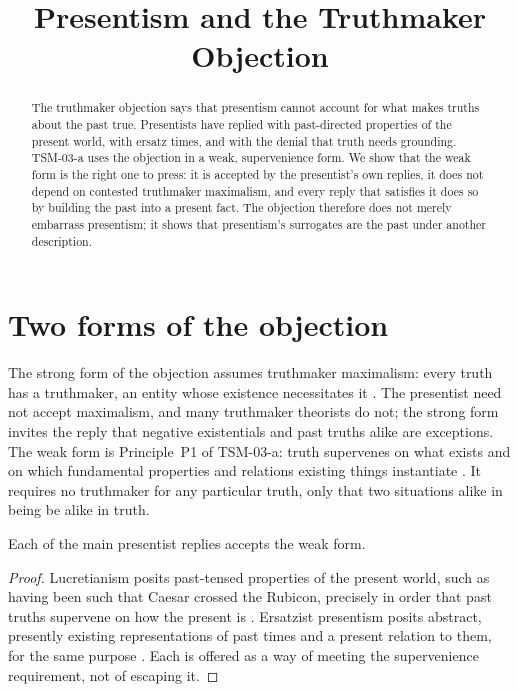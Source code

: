 \documentclass{situationist-preprint}
\title{Presentism and the Truthmaker Objection}
\begin{document}
\maketitle

\begin{abstract}
The truthmaker objection says that presentism cannot account for what makes truths about the past true. Presentists have replied with past-directed properties of the present world, with ersatz times, and with the denial that truth needs grounding. TSM-03-a uses the objection in a weak, supervenience form. We show that the weak form is the right one to press: it is accepted by the presentist's own replies, it does not depend on contested truthmaker maximalism, and every reply that satisfies it does so by building the past into a present fact. The objection therefore does not merely embarrass presentism; it shows that presentism's surrogates are the past under another description.
\end{abstract}

\section{Two forms of the objection}

The strong form of the objection assumes truthmaker maximalism: every truth has a truthmaker, an entity whose existence necessitates it \citep{Armstrong2004}. The presentist need not accept maximalism, and many truthmaker theorists do not; the strong form invites the reply that negative existentials and past truths alike are exceptions. The weak form is Principle~P1 of TSM-03-a: truth supervenes on what exists and on which fundamental properties and relations existing things instantiate \citep{Bigelow1988,Lewis2001}. It requires no truthmaker for any particular truth, only that two situations alike in being be alike in truth.

\begin{proposition}\label{p:accept}
Each of the main presentist replies accepts the weak form.
\end{proposition}

\begin{proof}
Lucretianism posits past-tensed properties of the present world, such as having been such that Caesar crossed the Rubicon, precisely in order that past truths supervene on how the present is \citep{Bigelow1996}. Ersatzist presentism posits abstract, presently existing representations of past times and a present relation to them, for the same purpose \citep{Crisp2007}. Each is offered as a way of meeting the supervenience requirement, not of escaping it.
\end{proof}
\end{document}
